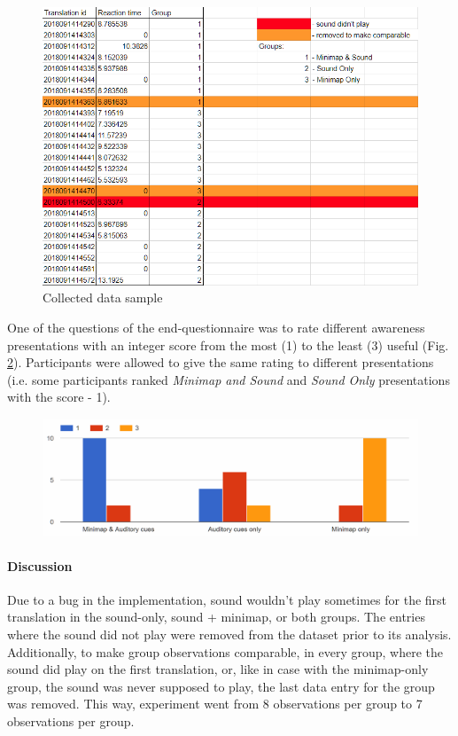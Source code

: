 \begin{figure}
	\centering
	\includegraphics[width=0.7\linewidth]{figures/final_study_data_example}
	\caption{Collected data sample}
	\label{fig:finalstudydataexample}
\end{figure}

One of the questions of the end-questionnaire was to rate different awareness presentations with an integer score from the most (1) to the least (3) useful (Fig. \ref{fig:finalstudyawarenesspresentationuserpreference}). Participants were allowed to give the same rating to different presentations (i.e. some participants ranked \textit{Minimap and Sound} and \textit{Sound Only} presentations with the score - 1).

\begin{figure}
	\centering
	\includegraphics[width=0.7\linewidth]{figures/final_study_awareness_presentation_user_preference}
	\caption{}
	\label{fig:finalstudyawarenesspresentationuserpreference}
\end{figure}


\paragraph{Discussion}
Due to a bug in the implementation, sound wouldn't play sometimes for the first translation in the sound-only, sound + minimap, or both groups. The entries where the sound did not play were removed from the dataset prior to its analysis. Additionally, to make group observations comparable, in every group, where the sound did play on the first translation, or, like in case with the minimap-only group, the sound was never supposed to play, the last data entry for the group was removed. This way, experiment went from 8 observations per group to 7 observations per group.

